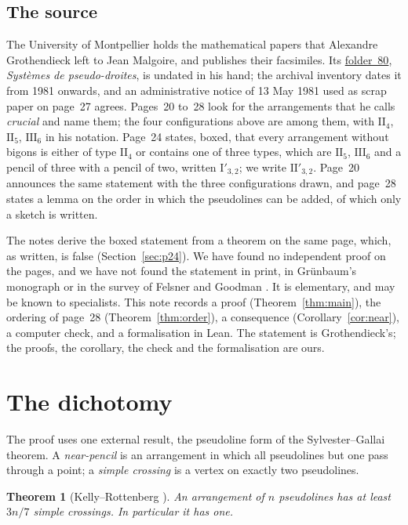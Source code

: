 \documentclass[11pt,a4paper]{amsart}
\newtheorem{theorem}{Theorem}
\theoremstyle{definition}
\theoremstyle{remark}
\newcommand{\II}[1]{\mathrm{II}_{#1}}
\newcommand{\IIp}{\mathrm{II}'_{3,2}}
\newcommand{\III}{\mathrm{III}_{6}}
\newcommand{\fac}[1]{\href{https://grothendieck.umontpellier.fr/#1.pdf}{folder~#1}}
\begin{document}
\subsection*{The source}
The University of Montpellier holds the mathematical papers that Alexandre Grothendieck left to Jean Malgoire, and publishes their facsimiles. Its \fac{80}, \emph{Systèmes de pseudo-droites}, is undated in his hand; the archival inventory dates it from 1981 onwards, and an administrative notice of 13 May 1981 used as scrap paper on page~27 agrees. Pages~20 to~28 look for the arrangements that he calls \emph{crucial} and name them; the four configurations above are among them, with $\II4$, $\II5$, $\III$ in his notation. Page~24 states, boxed, that every arrangement without bigons is either of type $\II4$ or contains one of three types, which are $\II5$, $\III$ and a pencil of three with a pencil of two, written $\mathrm{I}'_{3,2}$; we write $\IIp$. Page~20 announces the same statement with the three configurations drawn, and page~28 states a lemma on the order in which the pseudolines can be added, of which only a sketch is written.

The notes derive the boxed statement from a theorem on the same page, which, as written, is false (Section~\ref{sec:p24}). We have found no independent proof on the pages, and we have not found the statement in print, in Grünbaum's monograph \cite{grunbaum1972} or in the survey of Felsner and Goodman \cite{felsnergoodman2017}. It is elementary, and may be known to specialists. This note records a proof (Theorem~\ref{thm:main}), the ordering of page~28 (Theorem~\ref{thm:order}), a consequence (Corollary~\ref{cor:near}), a computer check, and a formalisation in Lean. The statement is Grothendieck's; the proofs, the corollary, the check and the formalisation are ours.

\section{The dichotomy}

The proof uses one external result, the pseudoline form of the Sylvester--Gallai theorem. A \emph{near-pencil} is an arrangement in which all pseudolines but one pass through a point; a \emph{simple crossing} is a vertex on exactly two pseudolines.

\begin{theorem}[Kelly--Rottenberg {\cite[Th.~3.6]{kellyrottenberg1972}}]\label{thm:sg}
An arrangement of $n$ pseudolines has at least $3n/7$ simple crossings. In particular it has one.
\end{theorem}
\end{document}
